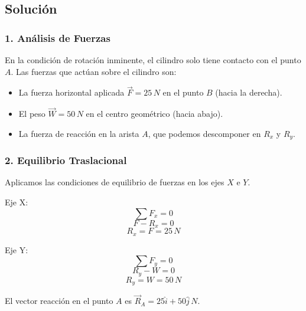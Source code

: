 \documentclass[12pt, a4paper]{article}
\begin{document}
\begin{center}
\end{center}

\subsection*{Solución}

\subsubsection*{1. Análisis de Fuerzas}
En la condición de rotación inminente, el cilindro solo tiene contacto con el punto $A$. Las fuerzas que actúan sobre el cilindro son:
\begin{itemize}
    \item La fuerza horizontal aplicada $\vec{F} = 25 \, \si{N}$ en el punto $B$ (hacia la derecha).
    \item El peso $\vec{W} = 50 \, \si{N}$ en el centro geométrico (hacia abajo).
    \item La fuerza de reacción en la arista $A$, que podemos descomponer en $R_x$ y $R_y$.
\end{itemize}

\subsubsection*{2. Equilibrio Traslacional}
Aplicamos las condiciones de equilibrio de fuerzas en los ejes $X$ e $Y$.

Eje X:
$$\sum F_x = 0$$
$$F - R_x = 0$$
$$R_x = F = 25 \, \si{N}$$

Eje Y:
$$\sum F_y = 0$$
$$R_y - W = 0$$
$$R_y = W = 50 \, \si{N}$$

El vector reacción en el punto $A$ es $\vec{R}_A = 25\hat{i} + 50\hat{j} \, \si{N}$.
\end{document}
